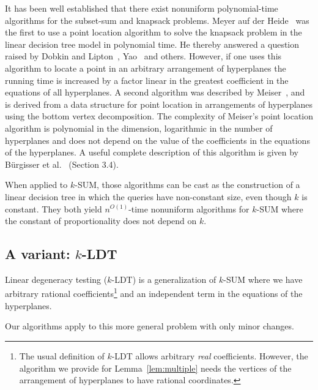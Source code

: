 It has been well established that there exist nonuniform
polynomial-time algorithms for the subset-sum and knapsack problems.
%
Meyer auf der Heide~\cite{M84} was the first to use a point location algorithm to solve
the knapsack problem in the linear decision tree model in polynomial time. He
thereby answered a question raised by Dobkin and Lipton~\cite{DL74,DL78},
Yao~\cite{Y82} and others. However, if one uses this algorithm to locate a
point in an arbitrary arrangement of hyperplanes the running time is increased
by a factor linear in the greatest coefficient in the equations of all
hyperplanes.
%
A second algorithm was described by Meiser~\cite{M93}, and is derived from a
data structure for point location in arrangements of hyperplanes using the
bottom vertex decomposition.
%
The complexity of Meiser's point location algorithm is polynomial in the
dimension, logarithmic in the number of hyperplanes and does not depend on the
value of the coefficients in the equations of the hyperplanes. A useful
complete description of this algorithm is given by Bürgisser et al.~\cite{B97}
(Section 3.4).

When applied to \(k\)-SUM, those algorithms can be cast as the construction of
a linear decision tree in which the queries have non-constant size, even though
\(k\) is constant. They both yield \(n^{O(1)}\)-time nonuniform algorithms for
\(k\)-SUM where the constant of proportionality does not depend on \(k\).

\subsection{A variant: \(k\)-LDT}

Linear degeneracy testing (\(k\)-LDT) is a generalization of \(k\)-SUM where we
have arbitrary rational coefficients\footnote{The usual definition of \(k\)-LDT
allows arbitrary \emph{real} coefficients. However, the algorithm we provide
for Lemma~\ref{lem:multiple} needs the vertices of the arrangement of
hyperplanes to have rational coordinates.}
and an independent term in the equations
of the hyperplanes.
%

%
Our algorithms apply to this more general problem with only minor changes.



